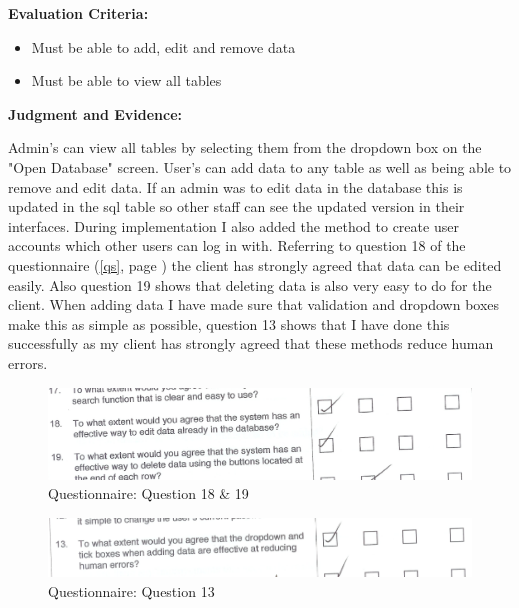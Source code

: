 \textbf{Evaluation Criteria:}
\begin{itemize}
\item{Must be able to add, edit and remove data}
\item{Must be able to view all tables}
\end{itemize}

\textbf{Judgment and Evidence:}

Admin's can view all tables by selecting them from the dropdown box on the "Open Database" screen. User's can add data to any table as well as being able to remove and edit data. If an admin was to edit data in the database this is updated in the sql table so other staff can see the updated version in their interfaces. During implementation I also added the method to create user accounts which other users can log in with. Referring to question 18 of the questionnaire (\ref{qs}, page \pageref{qs}) the client has strongly agreed that data can be edited easily. Also question 19 shows that deleting data is also very easy to do for the client. When adding data I have made sure that validation and dropdown boxes make this as simple as possible, question 13 shows that I have done this successfully as my client has strongly agreed that these methods reduce human errors.

\begin{figure}[H]
    \includegraphics[width=\textwidth]{./Evaluation/EvaluationQuestionnaire/1819.png}
    \caption{Questionnaire: Question 18 \& 19} 
\end{figure}

\begin{figure}[H]
    \includegraphics[width=\textwidth]{./Evaluation/EvaluationQuestionnaire/13.png}
    \caption{Questionnaire: Question 13} 
\end{figure}

